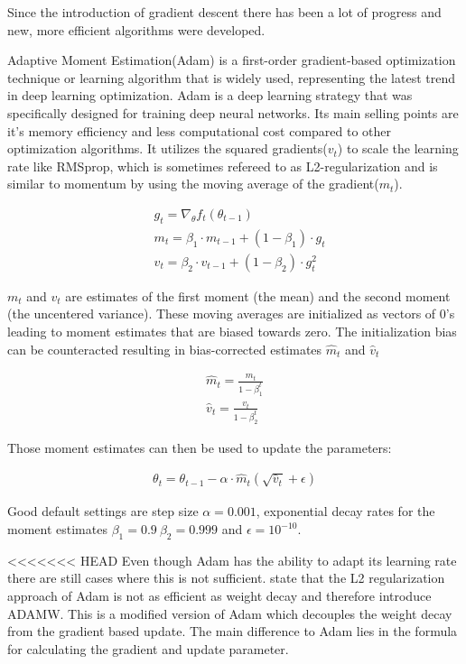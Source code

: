 \documentclass[
a4paper, 
12pt,
grayscalebody, %
abstract=on,
twoside, BCOR10mm, 12pt, DIV13,headinclude, footexclude, final, abstracton, openright
]{ibireprt}
\numberwithin{equation}{chapter}
\numberwithin{table}{chapter}
\numberwithin{figure}{chapter}
\numberwithin{algorithm}{chapter}
\numberwithin{example}{chapter}
\numberwithin{example}{chapter}
\begin{document}
Since the introduction of gradient descent there has been a lot of progress and new, more efficient algorithms were developed. 

Adaptive Moment Estimation(Adam)\cite{Kingma2014} is a first-order gradient-based optimization technique or learning algorithm that is widely used, representing the latest trend in deep learning optimization. Adam is a deep learning strategy that was specifically designed for training deep neural networks. Its main selling points are it's memory efficiency and less computational cost compared to other optimization algorithms. 
It  utilizes the squared gradients($v_t$) to scale the learning rate like RMSprop, which is sometimes refereed to as L2-regularization and is similar to momentum by using the moving average of the gradient($m_t$).


\begin{align}
	& g_t = \nabla_\theta f_t(\theta_{t-1})\\
	& m_t =\beta_1\cdot m_{t-1} + (1- \beta_1)\cdot g_t \\
	& v_t =\beta_2\cdot v_{t-1} + (1- \beta_2)\cdot g_t^2
\end{align}

$m_t$ and $v_t$ are estimates of the first moment (the mean) and the second moment (the uncentered
variance). These moving averages are initialized as vectors of 0's leading to moment estimates that are  biased towards zero. The initialization bias can be counteracted resulting in bias-corrected estimates $\hat{m}_t$ and $\hat{v}_t$

\begin{align}
	\hat{m}_t =\frac{m_t}{1- \beta_1^t} \\
	\hat{v}_t = \frac{v_t}{1- \beta_2^t}
\end{align}

Those moment estimates can then be used to update the parameters: 

\begin{align}
	\theta_t = \theta_{t-1}-\alpha\cdot\hat{m}_t(\sqrt{\hat{v}_t}+\epsilon)
\end{align}

Good default settings are step size $\alpha = 0.001$, exponential decay rates for the moment estimates $\beta_1 = 0.9\ \beta_2 = 0.999 $ and $\epsilon =  10^{-10}$.



<<<<<<< HEAD
Even though Adam has the ability to adapt its learning rate there are still cases where this is not sufficient. \cite{Loshchilov2017} state that the L2 regularization approach of Adam is not as efficient as weight decay and therefore introduce ADAMW. This is a modified version of Adam which decouples the weight decay from the gradient based update. The main difference to Adam lies in the formula for calculating the gradient and update parameter. 
\end{document}
